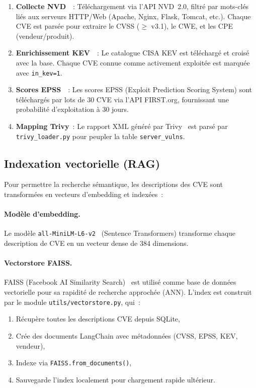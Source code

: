\documentclass[runningheads]{llncs}
\begin{document}
\begin{enumerate}[nosep]
    \item \textbf{Collecte NVD}~\cite{nvd2024}~: Téléchargement via l'API NVD~2.0, filtré par mots-clés liés aux serveurs HTTP/Web (Apache, Nginx, Flask, Tomcat, etc.). Chaque CVE est parsée pour extraire le CVSS ($\geq$ v3.1), le CWE, et les CPE (vendeur/produit).
    \item \textbf{Enrichissement KEV}~\cite{cisa_kev2024}~: Le catalogue CISA KEV est téléchargé et croisé avec la base. Chaque CVE connue comme activement exploitée est marquée avec \texttt{in\_kev=1}.
    \item \textbf{Scores EPSS}~\cite{epss2023}~: Les scores EPSS (Exploit Prediction Scoring System) sont téléchargés par lots de 30 CVE via l'API FIRST.org, fournissant une probabilité d'exploitation à 30 jours.
    \item \textbf{Mapping Trivy}~: Le rapport XML généré par Trivy~\cite{trivy2024} est parsé par \texttt{trivy\_loader.py} pour peupler la table \texttt{server\_vulns}.
\end{enumerate}

\subsection{Indexation vectorielle (RAG)}

Pour permettre la recherche sémantique, les descriptions des CVE sont transformées en vecteurs d'embedding et indexées~:

\paragraph{Modèle d'embedding.} Le modèle \texttt{all-MiniLM-L6-v2}~\cite{reimers2019sentencebert} (Sentence Transformers) transforme chaque description de CVE en un vecteur dense de 384 dimensions.

\paragraph{Vectorstore FAISS.} FAISS (Facebook AI Similarity Search)~\cite{johnson2019faiss} est utilisé comme base de données vectorielle pour sa rapidité de recherche approchée (ANN). L'index est construit par le module \texttt{utils/vectorstore.py}, qui~:
\begin{enumerate}[nosep]
    \item Récupère toutes les descriptions CVE depuis SQLite,
    \item Crée des documents LangChain avec métadonnées (CVSS, EPSS, KEV, vendeur),
    \item Indexe via \texttt{FAISS.from\_documents()},
    \item Sauvegarde l'index localement pour chargement rapide ultérieur.
\end{enumerate}
\end{document}
